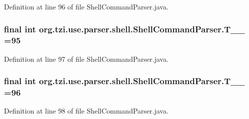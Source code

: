 Definition at line 96 of file Shell\-Command\-Parser.\-java.

\hypertarget{classorg_1_1tzi_1_1use_1_1parser_1_1shell_1_1_shell_command_parser_a666fb0d060946dc90137b5e87d56b846}{
\subsubsection[{T\-\_\-\-\_\-95}]{\setlength{\rightskip}{0pt plus 5cm}final int org.\-tzi.\-use.\-parser.\-shell.\-Shell\-Command\-Parser.\-T\-\_\-\-\_ =95\hspace{0.3cm}{\ttfamily [static]}}}\label{classorg_1_1tzi_1_1use_1_1parser_1_1shell_1_1_shell_command_parser_a666fb0d060946dc90137b5e87d56b846}


Definition at line 97 of file Shell\-Command\-Parser.\-java.

\hypertarget{classorg_1_1tzi_1_1use_1_1parser_1_1shell_1_1_shell_command_parser_ac63002c15414f65519626d5bb7b8edc3}{
\subsubsection[{T\-\_\-\-\_\-96}]{\setlength{\rightskip}{0pt plus 5cm}final int org.\-tzi.\-use.\-parser.\-shell.\-Shell\-Command\-Parser.\-T\-\_\-\-\_ =96\hspace{0.3cm}{\ttfamily [static]}}}\label{classorg_1_1tzi_1_1use_1_1parser_1_1shell_1_1_shell_command_parser_ac63002c15414f65519626d5bb7b8edc3}


Definition at line 98 of file Shell\-Command\-Parser.\-java.

